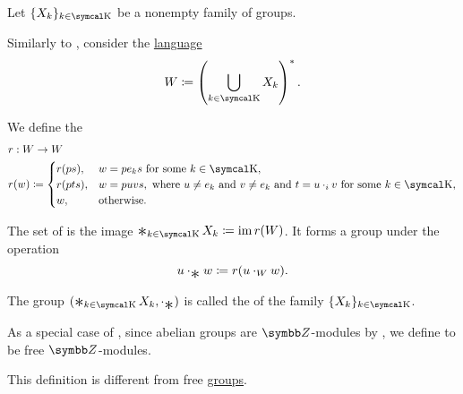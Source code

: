 \begin{definition}\label{def:group_free_product}
  Let \( \{ X_k \}_{k \in \CK} \) be a nonempty family of groups.

  Similarly to , consider the \hyperref[def:language]{language}
  \begin{equation*}
    W \coloneqq \left( \bigcup_{k \in \CK} X_k \right)^{*}.
  \end{equation*}

  We define the 
  \begin{align*}
     & r: W \to W                                \\
     & r(w) \coloneqq \begin{cases}
      r(ps),  & w = p e_k s \text{ for some } k \in \CK,                                                                              \\
      r(pts), & w = puvs, \text{ where } u \neq e_k \text{ and } v \neq e_k \text{ and } t = u \cdot_i v \text{ for some } k \in \CK, \\
      w,      & \text{otherwise}.
    \end{cases}
  \end{align*}

  The set of  is the image \( \Ast_{k \in \CK} X_k \coloneqq \Img r(W) \). It forms a group under the operation
  \begin{equation*}
    u \cdot_{\Ast} w \coloneqq r(u \cdot_{W} w).
  \end{equation*}

  The group \( (\Ast_{k \in \CK} X_k, \cdot_{\Ast}) \) is called the  of the family \( \{ X_k \}_{k \in \CK} \).
\end{definition}

\begin{definition}\label{def:free_abelian_group}
  As a special case of , since abelian groups are \( \BZ \)-modules by , we define  to be free \( \BZ \)-modules.

  This definition is different from free \hyperref[def:free_group]{groups}.
\end{definition}

